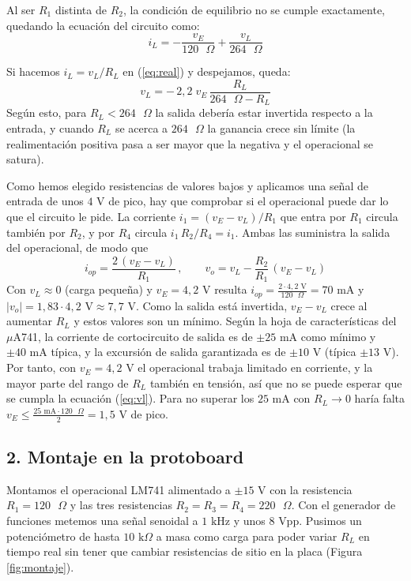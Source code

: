 \documentclass[11pt,a4paper]{article}
\begin{document}
	Al ser $R_1$ distinta de $R_2$, la condición de equilibrio no se cumple exactamente, quedando la ecuación del circuito como:
	\begin{equation}
		i_L = -\frac{v_E}{120\text{ }\Omega} + \frac{v_L}{264\text{ }\Omega}
		\label{eq:real}
	\end{equation}
	
	Si hacemos $i_L = v_L/R_L$ en (\ref{eq:real}) y despejamos, queda:
	\begin{equation}
		v_L = -\,2,2\; v_E\,\frac{R_L}{264\text{ }\Omega - R_L}
		\label{eq:vl}
	\end{equation}
	Según esto, para $R_L < 264\text{ }\Omega$ la salida debería estar invertida respecto a la entrada, y cuando $R_L$ se acerca a $264\text{ }\Omega$ la ganancia crece sin límite (la realimentación positiva pasa a ser mayor que la negativa y el operacional se satura).
	
	Como hemos elegido resistencias de valores bajos y aplicamos una señal de entrada de unos $4\text{ V}$ de pico, hay que comprobar si el operacional puede dar lo que el circuito le pide. La corriente $i_1=(v_E-v_L)/R_1$ que entra por $R_1$ circula también por $R_2$, y por $R_4$ circula $i_1\,R_2/R_4=i_1$. Ambas las suministra la salida del operacional, de modo que
	\begin{equation}
		i_{op}=\frac{2\,(v_E-v_L)}{R_1}\,, \qquad v_o=v_L-\frac{R_2}{R_1}\,(v_E-v_L)
		\label{eq:iop}
	\end{equation}
	Con $v_L\approx 0$ (carga pequeña) y $v_E=4,2\text{ V}$ resulta $i_{op}=\frac{2\cdot 4,2\text{ V}}{120\text{ }\Omega}=70\text{ mA}$ y $|v_o|=1,83\cdot 4,2\text{ V}\approx 7,7\text{ V}$. Como la salida está invertida, $v_E-v_L$ crece al aumentar $R_L$ y estos valores son un mínimo. Según la hoja de características del $\mu$A741, la corriente de cortocircuito de salida es de $\pm 25\text{ mA}$ como mínimo y $\pm 40\text{ mA}$ típica, y la excursión de salida garantizada es de $\pm 10\text{ V}$ (típica $\pm 13\text{ V}$). Por tanto, con $v_E=4,2\text{ V}$ el operacional trabaja limitado en corriente, y la mayor parte del rango de $R_L$ también en tensión, así que no se puede esperar que se cumpla la ecuación (\ref{eq:vl}). Para no superar los $25\text{ mA}$ con $R_L\to0$ haría falta $v_E\le \frac{25\text{ mA}\cdot 120\text{ }\Omega}{2}=1,5\text{ V}$ de pico.
	
	\clearpage
	
	\subsection*{2. Montaje en la protoboard}
	Montamos el operacional LM741 alimentado a $\pm 15\text{ V}$ con la resistencia $R_1 = 120\text{ }\Omega$ y las tres resistencias $R_2 = R_3 = R_4 = 220\text{ }\Omega$. Con el generador de funciones metemos una señal senoidal a $1\text{ kHz}$ y unos $8\text{ Vpp}$. Pusimos un potenciómetro de hasta $10\text{ k}\Omega$ a masa como carga para poder variar $R_L$ en tiempo real sin tener que cambiar resistencias de sitio en la placa (Figura \ref{fig:montaje}).
	
\end{document}
